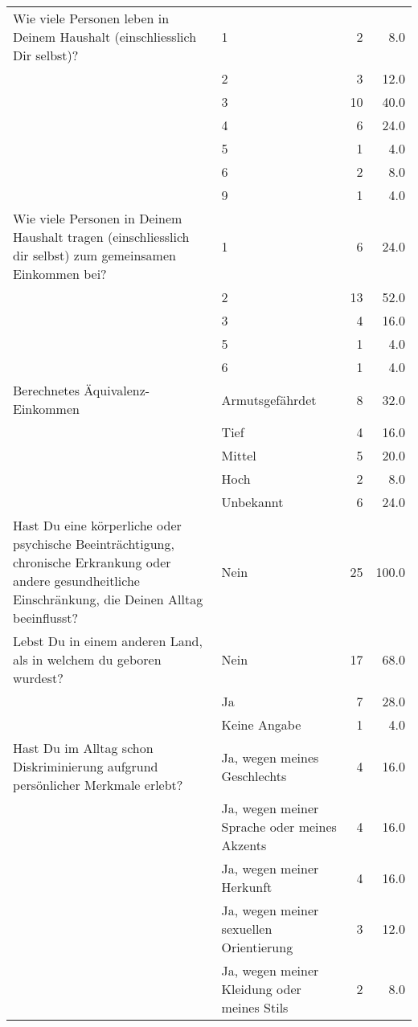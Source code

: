 \begin{appendices}
\begin{longtable}{p{5.5cm}p{5.5cm}rr}
    \addlinespace
    Wie viele Personen leben in Deinem Haushalt (einschliesslich Dir selbst)? & 1 & 2 & 8.0 \\*
     & 2 & 3 & 12.0 \\*
     & 3 & 10 & 40.0 \\*
     & 4 & 6 & 24.0 \\*
     & 5 & 1 & 4.0 \\*
     & 6 & 2 & 8.0 \\*
     & 9 & 1 & 4.0 \\
    \midrule
    \addlinespace
    Wie viele Personen in Deinem Haushalt tragen (einschliesslich dir selbst) zum gemeinsamen Einkommen bei? & 1 & 6 & 24.0 \\*
     & 2 & 13 & 52.0 \\*
     & 3 & 4 & 16.0 \\*
     & 5 & 1 & 4.0 \\*
     & 6 & 1 & 4.0 \\
     \midrule
    \addlinespace
    Berechnetes Äquivalenz-Einkommen \parencite[nach][]{bundesamtfuerstatistikVerteilungVerfuegbarenAequivalenzeinkommens2025} & Armutsgefährdet & 8 & 32.0 \\*
     & Tief & 4 & 16.0 \\*
     & Mittel & 5 & 20.0 \\*
     & Hoch & 2 & 8.0 \\*
     & Unbekannt & 6 & 24.0 \\
     \midrule
    \addlinespace
    Hast Du eine körperliche oder psychische Beeinträchtigung, chronische Erkrankung oder andere gesundheitliche Einschränkung, die Deinen Alltag beeinflusst? & Nein & 25 & 100.0 \\
    \midrule
    \addlinespace
    Lebst Du in einem anderen Land, als in welchem du geboren wurdest? & Nein & 17 & 68.0 \\*
     & Ja & 7 & 28.0 \\*
     & Keine Angabe & 1 & 4.0 \\
     \midrule
    \addlinespace
    Hast Du im Alltag schon Diskriminierung aufgrund persönlicher Merkmale erlebt? & Ja, wegen meines Geschlechts & 4 & 16.0 \\*
     & Ja, wegen meiner Sprache oder meines Akzents & 4 & 16.0 \\*
     & Ja, wegen meiner Herkunft & 4 & 16.0 \\*
     & Ja, wegen meiner sexuellen Orientierung & 3 & 12.0 \\*
     & Ja, wegen meiner Kleidung oder meines Stils & 2 & 8.0 \\*

\end{longtable}
\end{appendices}
